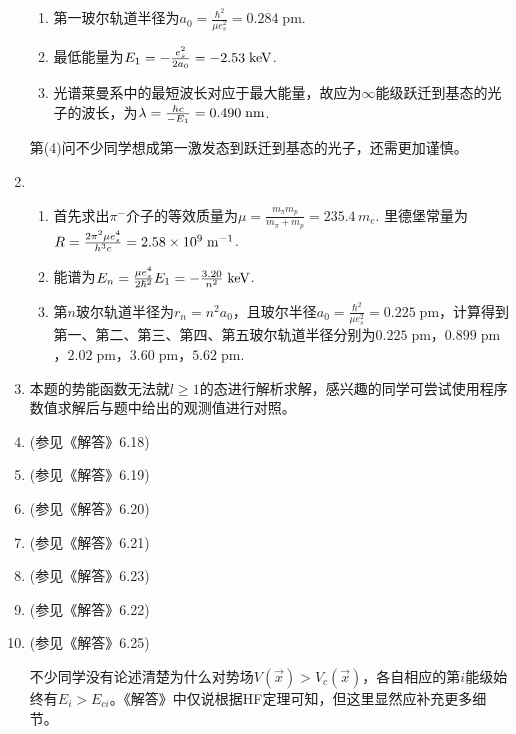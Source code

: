 \begin{enumerate}[label=\textbf{5.\arabic*}, listparindent=\parindent, leftmargin=-0.5mm]
\begin{enumerate}[label=(\arabic*)]
    \item 第一玻尔轨道半径为$a_0 = \frac{\hbar^2}{\mu e_s^2} = 0.284\;\mathrm{pm}$.
    
    \item 最低能量为$E_1 = -\frac{e_s^2}{2 a_0} = -2.53\;\mathrm{keV}$.
    
    \item 光谱莱曼系中的最短波长对应于最大能量，故应为$\infty$能级跃迁到基态的光子的波长，为$\lambda = \frac{hc}{-E_1} = 0.490\;\mathrm{nm}$.
\end{enumerate}


第(4)问不少同学想成第一激发态到跃迁到基态的光子，还需更加谨慎。


\item
\begin{enumerate}[label=(\arabic*)]
    \item 首先求出$\pi^-$介子的等效质量为$\mu = \frac{m_\pi m_p}{m_\pi+m_p} = 235.4\,m_e$. 里德堡常量为$R = \frac{2\pi^2 \mu e_s^4}{h^3 c} = 2.58\times 10^{9}\;\mathrm{m^{-1}}$.
    \item 能谱为$E_n = \frac{\mu e_s^4}{2\hbar^2}E_1 = -\frac{3.20}{n^2}\;\mathrm{keV}$.
    \item 第$n$玻尔轨道半径为$r_n = n^2a_0$，且玻尔半径$a_0 = \frac{\hbar^2}{\mu e_s^2} = 0.225\;\mathrm{pm}$，计算得到第一、第二、第三、第四、第五玻尔轨道半径分别为$0.225\;\mathrm{pm}$，$0.899\;\mathrm{pm}$，$2.02\;\mathrm{pm}$，$3.60\;\mathrm{pm}$，$5.62\;\mathrm{pm}$.
\end{enumerate}

\item 本题的势能函数无法就$l\geq 1$的态进行解析求解，感兴趣的同学可尝试使用程序数值求解后与题中给出的观测值进行对照。

\item (参见《解答》6.18)

\item (参见《解答》6.19)

\item (参见《解答》6.20)

\item (参见《解答》6.21)

\item (参见《解答》6.23)

\item (参见《解答》6.22)

\item (参见《解答》6.25)

不少同学没有论述清楚为什么对势场$V(\vec{x})>V_c(\vec{x})$，各自相应的第$i$能级始终有$E_i>E_{ci}$。《解答》中仅说根据HF定理可知，但这里显然应补充更多细节。


\end{enumerate}
